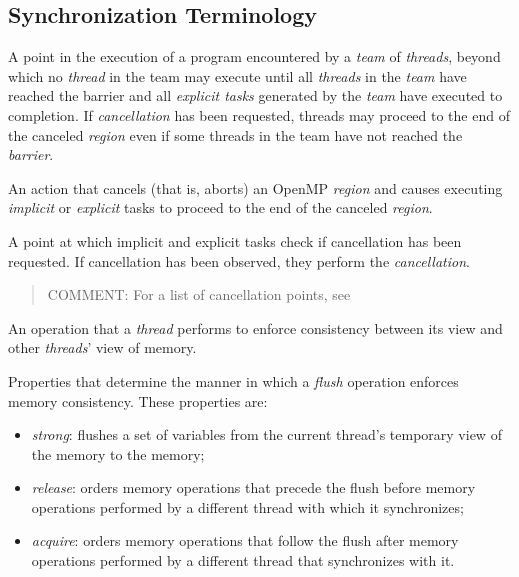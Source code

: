 %
%
\subsection{Synchronization Terminology}
\label{subsec:Synchronization Terminology}
\glossarydefstart
A point in the execution of a program encountered by a \emph{team} of \emph{threads}, beyond
which no \emph{thread} in the team may execute until all \emph{threads} in the \emph{team} have
reached the barrier and all \emph{explicit tasks} generated by the \emph{team} have executed to
completion. If \emph{cancellation} has been requested, threads may proceed to the end of
the canceled \emph{region} even if some threads in the team have not reached the \emph{barrier}.
\glossarydefend

\glossarydefstart
An action that cancels (that is, aborts) an OpenMP \emph{region} and causes executing
\emph{implicit} or \emph{explicit} tasks to proceed to the end of the canceled \emph{region}.
\glossarydefend

\glossarydefstart
A point at which implicit and explicit tasks check if cancellation has been
requested. If cancellation has been observed, they perform the \emph{cancellation}.

\begin{quote}
COMMENT: For a list of cancellation points, see 
\end{quote}
\glossarydefend
\bigskip

\glossarydefstart
An operation that a \emph{thread} performs to enforce consistency between its
view and other \emph{threads}' view of memory.
\glossarydefend

\glossarydefstart
Properties that determine the manner in which a \emph{flush} operation enforces
memory consistency. These properties are:
\begin{itemize}
    \item \emph{strong}: flushes a set of variables from the current thread's
        temporary view of the memory to the memory;
    \item \emph{release}: orders memory operations that precede the flush
        before memory operations performed by a different thread with which it
        synchronizes;
    \item \emph{acquire}: orders memory operations that follow the flush after
        memory operations performed by a different thread that synchronizes
        with it.
\end{itemize}

